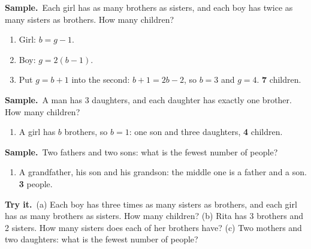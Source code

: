 \documentclass[11pt,a4paper]{article}
\newif\ifkeepsamp
\newcommand{\samp}{\ifkeepsamp\needspace{4\baselineskip}\fi\textbf{\color{ember}Sample.}\ }
\newcommand{\tryit}[1]{\textbf{\color{ember}Try it.}\ #1}
\begin{document}
\samp Each girl has as many brothers as sisters, and each boy has twice as many sisters as brothers. How many children?
\begin{enumerate}
\item Girl: $b = g - 1$.
\item Boy: $g = 2(b - 1)$.
\item Put $g = b + 1$ into the second: $b + 1 = 2b - 2$, so $b = 3$ and $g = 4$. \textbf{7} children.
\end{enumerate}
\samp A man has 3 daughters, and each daughter has exactly one brother. How many children?
\begin{enumerate}
\item A girl has $b$ brothers, so $b = 1$: one son and three daughters, \textbf{4} children.
\end{enumerate}
\samp Two fathers and two sons: what is the fewest number of people?
\begin{enumerate}
\item A grandfather, his son and his grandson: the middle one is a father and a son. \textbf{3} people.
\end{enumerate}

\tryit (a) Each boy has three times as many sisters as brothers, and each girl has as many brothers as sisters. How many children? (b) Rita has 3 brothers and 2 sisters. How many sisters does each of her brothers have? (c) Two mothers and two daughters: what is the fewest number of people?
\end{document}
